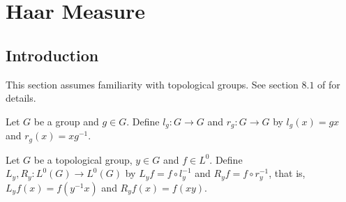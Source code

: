 \documentclass{book}
\begin{document}
	
	

	
	
	
	
	
	
	
	
	
	
	
	
	
	
	
	
	
	
	
	
	
	
	
	
	
	
	
	


	
	


















	\newpage
	\chapter{Haar Measure}
	
	\section{Introduction}
	
	\begin{note}
	This section assumes familiarity with topological groups. See section $8.1$ of \cite{analysis} for details. 
	\end{note}

	\begin{defn}  
		Let $G$ be a group and $g \in G$. Define $l_g:G \rightarrow G$ and $r_g:G \rightarrow G$ by $l_g(x) = gx$ and $r_g(x) = xg^{-1}$. 
	\end{defn}

	\begin{defn}  
		Let $G$ be a topological group, $y \in G$ and $f \in L^0$.  Define $L_y, R_y: L^0(G) \rightarrow L^0(G)$ by $L_y f = f \circ l_y^{-1}$ and $R_y f = f \circ r_y^{-1}$, that is, $L_yf(x) = f(y^{-1}x)$ and $R_yf(x) = f(xy)$.
	\end{defn}
	
\end{document}
